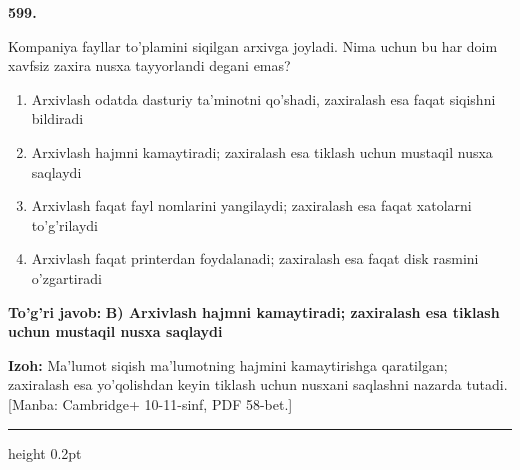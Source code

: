 \documentclass[10pt,a4paper]{article}
\begin{document}
{\bfseries\sffamily\color{ink} 599.}
\par
Kompaniya fayllar to'plamini siqilgan arxivga joyladi. Nima uchun bu har doim xavfsiz zaxira nusxa tayyorlandi degani emas?
\begin{enumerate}[label=\Alph*),leftmargin=9mm]
\item Arxivlash odatda dasturiy ta'minotni qo'shadi, zaxiralash esa faqat siqishni bildiradi
\item Arxivlash hajmni kamaytiradi; zaxiralash esa tiklash uchun mustaqil nusxa saqlaydi
\item Arxivlash faqat fayl nomlarini yangilaydi; zaxiralash esa faqat xatolarni to'g'rilaydi
\item Arxivlash faqat printerdan foydalanadi; zaxiralash esa faqat disk rasmini o'zgartiradi
\end{enumerate}
\begin{tcolorbox}[enhanced,breakable,colback=teal!4,colframe=teal!60!black,boxrule=0.45pt,arc=1.2mm,left=2.7mm,right=2.7mm,top=1.8mm,bottom=1.8mm,before skip=2mm,after skip=2mm]
{\bfseries\sffamily\color{teal}To'g'ri javob:} \textbf{B) Arxivlash hajmni kamaytiradi; zaxiralash esa tiklash uchun mustaqil nusxa saqlaydi}
\par\smallskip
{\bfseries Izoh:} Ma'lumot siqish ma'lumotning hajmini kamaytirishga qaratilgan; zaxiralash esa yo'qolishdan keyin tiklash uchun nusxani saqlashni nazarda tutadi. [Manba: Cambridge+ 10-11-sinf, PDF 58-bet.]
\end{tcolorbox}
\vspace{2mm}\hrule height 0.2pt\vspace{3mm}
\end{document}
